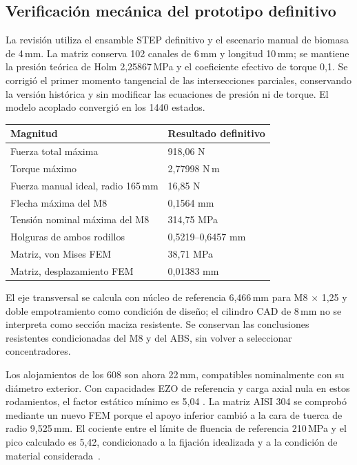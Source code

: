 \subsection{Verificación mecánica del prototipo definitivo}
La revisión utiliza el ensamble STEP definitivo y el escenario manual de
biomasa de 4\,mm. La matriz conserva 102 canales de 6\,mm y longitud 10\,mm;
se mantiene la presión teórica de Holm 2,25867\,MPa y el coeficiente efectivo
de torque 0,1. Se corrigió el primer momento tangencial de las intersecciones
parciales, conservando la versión histórica y sin modificar las ecuaciones
de presión ni de torque. El modelo acoplado convergió en los 1440 estados.
\begin{center}\begin{tabular}{ll}\toprule
Magnitud & Resultado definitivo\\\midrule
Fuerza total máxima & 918,06 N\\
Torque máximo & 2,77998 N\,m\\
Fuerza manual ideal, radio 165\,mm & 16,85 N\\
Flecha máxima del M8 & 0,1564 mm\\
Tensión nominal máxima del M8 & 314,75 MPa\\
Holguras de ambos rodillos & 0,5219--0,6457 mm\\
Matriz, von Mises FEM & 38,71 MPa\\
Matriz, desplazamiento FEM & 0,01383 mm\\
\bottomrule\end{tabular}\end{center}

El eje transversal se calcula con núcleo de referencia 6,466\,mm para
M8 $\times$ 1,25 y doble empotramiento como condición de diseño; el cilindro
CAD de 8\,mm no se interpreta como sección maciza resistente. Se conservan
las conclusiones resistentes condicionadas del M8 y del ABS, sin volver
a seleccionar concentradores.

Los alojamientos de los 608 son ahora 22\,mm, compatibles nominalmente con
su diámetro exterior. Con capacidades EZO de referencia y carga axial
nula en estos rodamientos, el factor estático mínimo es 5,04
\cite{ezo_608zz_2026}. La matriz AISI 304 se comprobó mediante un nuevo FEM
porque el apoyo inferior cambió a la cara de tuerca de radio 9,525\,mm.
El cociente entre el límite de fluencia de referencia 210\,MPa y el pico
calculado es 5,42, condicionado a la fijación idealizada
y a la condición de material considerada~\cite{outokumpu_core_2026}.


